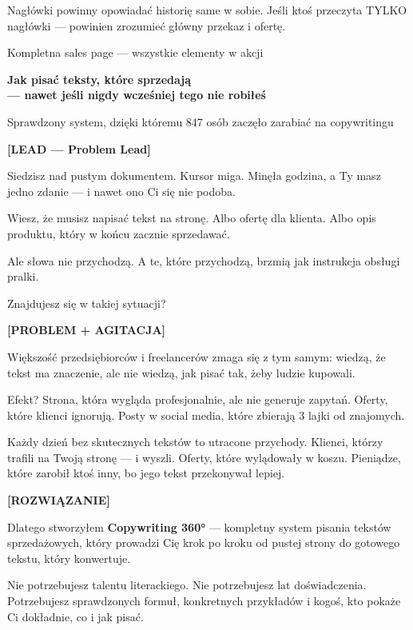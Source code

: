 \documentclass[
  12pt,
  a4paper,
  twoside,
  openright,
  12pt,
  DIV=12,
  BCOR=12mm]{scrbook}
\begin{document}
\begin{wazne}
Nagłówki powinny opowiadać historię same w sobie. Jeśli ktoś przeczyta TYLKO nagłówki --- powinien zrozumieć główny przekaz i ofertę.
\end{wazne}

\begin{przyklad}{Kompletna sales page --- wszystkie elementy w akcji}

\begin{center}
{\Large\textbf{Jak pisać teksty, które sprzedają\\--- nawet jeśli nigdy wcześniej tego nie robiłeś}}

\medskip
{\small Sprawdzony system, dzięki któremu 847 osób zaczęło zarabiać na copywritingu}
\end{center}

\bigskip
\textbf{[LEAD --- Problem Lead]}

Siedzisz nad pustym dokumentem. Kursor miga. Minęła godzina, a Ty masz jedno zdanie --- i nawet ono Ci się nie podoba.

Wiesz, że musisz napisać tekst na stronę. Albo ofertę dla klienta. Albo opis produktu, który w końcu zacznie sprzedawać.

Ale słowa nie przychodzą. A te, które przychodzą, brzmią jak instrukcja obsługi pralki.

Znajdujesz się w takiej sytuacji?

\bigskip
\textbf{[PROBLEM + AGITACJA]}

Większość przedsiębiorców i freelancerów zmaga się z tym samym: wiedzą, że tekst ma znaczenie, ale nie wiedzą, jak pisać tak, żeby ludzie kupowali.

Efekt? Strona, która wygląda profesjonalnie, ale nie generuje zapytań. Oferty, które klienci ignorują. Posty w social media, które zbierają 3 lajki od znajomych.

Każdy dzień bez skutecznych tekstów to utracone przychody. Klienci, którzy trafili na Twoją stronę --- i wyszli. Oferty, które wylądowały w koszu. Pieniądze, które zarobił ktoś inny, bo jego tekst przekonywał lepiej.

\bigskip
\textbf{[ROZWIĄZANIE]}

Dlatego stworzyłem \textbf{Copywriting 360°} --- kompletny system pisania tekstów sprzedażowych, który prowadzi Cię krok po kroku od pustej strony do gotowego tekstu, który konwertuje.

Nie potrzebujesz talentu literackiego. Nie potrzebujesz lat doświadczenia. Potrzebujesz sprawdzonych formuł, konkretnych przykładów i kogoś, kto pokaże Ci dokładnie, co i jak pisać.


\end{przyklad}
\end{document}
